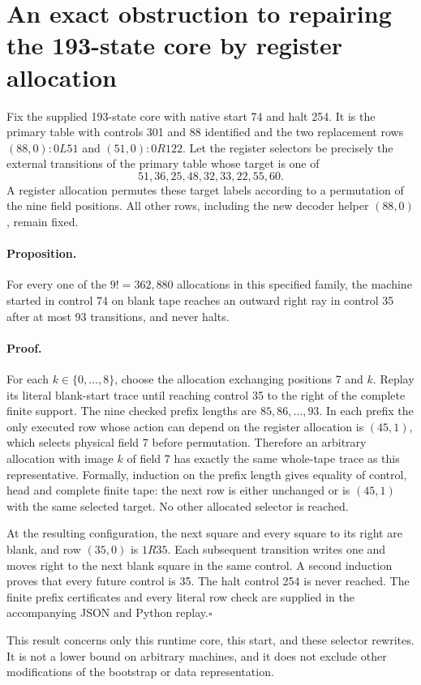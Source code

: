 \section{An exact obstruction to repairing the 193-state core by register allocation}

Fix the supplied 193-state core with native start 74 and halt 254.  It is the
primary table with controls 301 and 88 identified and the two replacement rows
$(88,0):0L51$ and $(51,0):0R122$.  Let the register selectors be precisely the
external transitions of the primary table whose target is one of
\[
51,36,25,48,32,33,22,55,60.
\]
A register allocation permutes these target labels according to a permutation
of the nine field positions.  All other rows, including the new decoder
helper $(88,0)$, remain fixed.

\paragraph{Proposition.}
For every one of the $9!=362{,}880$ allocations in this specified family, the
machine started in control 74 on blank tape reaches an outward right ray in
control 35 after at most 93 transitions, and never halts.

\paragraph{Proof.}
For each $k\in\{0,\ldots,8\}$, choose the allocation exchanging positions 7
and $k$.  Replay its literal blank-start trace until reaching control 35 to
the right of the complete finite support.  The nine checked prefix lengths
are $85,86,\ldots,93$.  In each prefix the only executed row whose action can
depend on the register allocation is $(45,1)$, which selects physical field
7 before permutation.  Therefore an arbitrary allocation with image $k$ of
field 7 has exactly the same whole-tape trace as this representative.
Formally, induction on the prefix length gives equality of control, head and
complete finite tape: the next row is either unchanged or is $(45,1)$ with
the same selected target.  No other allocated selector is reached.

At the resulting configuration, the next square and every square to its
right are blank, and row $(35,0)$ is $1R35$.  Each subsequent transition writes
one and moves right to the next blank square in the same control.  A second
induction proves that every future control is 35.  The halt control 254 is
never reached.  The finite prefix certificates and every literal row check
are supplied in the accompanying JSON and Python replay.\hfill$\square$

This result concerns only this runtime core, this start, and these selector
rewrites.  It is not a lower bound on arbitrary machines, and it does not
exclude other modifications of the bootstrap or data representation.
